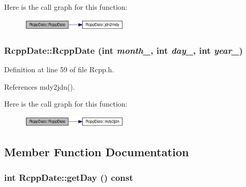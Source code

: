 Here is the call graph for this function:\nopagebreak
\begin{figure}[H]
\begin{center}
\leavevmode
\includegraphics[width=145pt]{classRcppDate_21adf306ddf84cf792f888d220bb9a3f_cgraph}
\end{center}
\end{figure}
\hypertarget{classRcppDate_8b96145664d63ec84267870787025fa4}{
\subsubsection[{RcppDate}]{\setlength{\rightskip}{0pt plus 5cm}RcppDate::RcppDate (int {\em month\_\-}, \/  int {\em day\_\-}, \/  int {\em year\_\-})}}
\label{classRcppDate_8b96145664d63ec84267870787025fa4}




Definition at line 59 of file Rcpp.h.

References mdy2jdn().

Here is the call graph for this function:\nopagebreak
\begin{figure}[H]
\begin{center}
\leavevmode
\includegraphics[width=145pt]{classRcppDate_8b96145664d63ec84267870787025fa4_cgraph}
\end{center}
\end{figure}


\subsection{Member Function Documentation}
\hypertarget{classRcppDate_20efbcdddceac536425407b3169fff5a}{
\subsubsection[{getDay}]{\setlength{\rightskip}{0pt plus 5cm}int RcppDate::getDay () const}}
\label{classRcppDate_20efbcdddceac536425407b3169fff5a}




